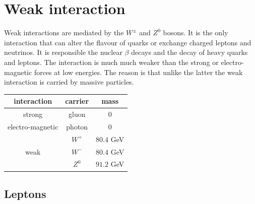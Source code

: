 \documentclass[12pt]{article}
\begin{document}
\section{Weak interaction}
Weak interactions are mediated by the $W^\pm$ and $Z^0$ bosons. It is the only interaction that can alter the flavour of quarks or exchange charged leptons and neutrinos. It is responsible the nuclear $\beta$ decays and the decay of heavy quarks and leptons. The interaction is much much weaker than the strong or electro-magnetic forces at low energies. The reason is that unlike the latter the weak interaction is carried by massive particles.
\begin{center}
\begin{tabular}{c|c|c}
interaction & carrier & mass \\
\hline
\hline
strong  & gluon & 0 \\
\hline
electro-magnetic  & photon & 0 \\
\hline
      & $W^+$ & $80.4$ GeV \\
weak  & $W^-$ & $80.4$ GeV \\
      & $Z^0$ & $91.2$ GeV 
\end{tabular}   
\end{center}
\subsection{Leptons}
\end{document}
